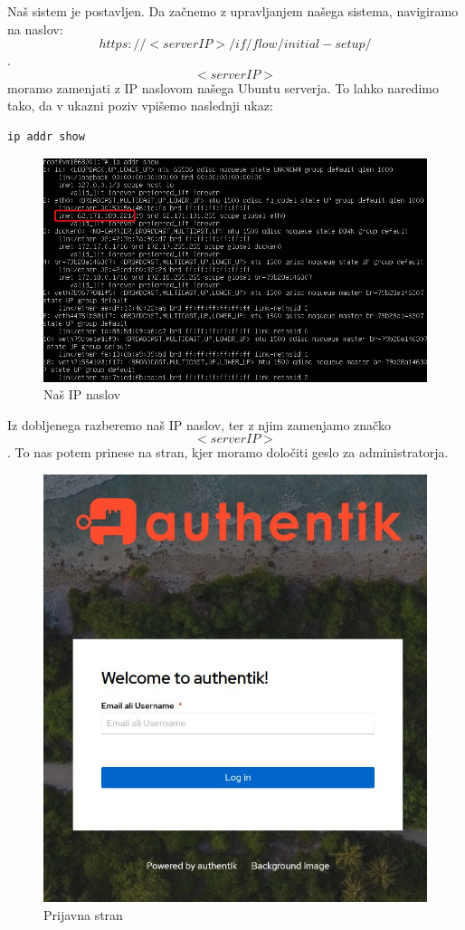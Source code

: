 \documentclass[a4paper,12pt,openright]{book}
\begin{document}
Naš sistem je postavljen. Da začnemo z upravljanjem našega sistema, navigiramo na naslov: $$https://<serverIP>/if/flow/initial-setup/$$. $$<serverIP>$$ moramo zamenjati z IP naslovom našega Ubuntu serverja. To lahko naredimo tako, da v ukazni poziv vpišemo naslednji ukaz:
\begin{lstlisting}[language=bash]
ip addr show
\end{lstlisting}

\begin{figure}[H]
\includegraphics[scale=0.75]{diploma-FRI-vzorec_11maj2021/IP naslov.jpg}
\caption{Naš IP naslov}
\label{fig:student}
\end{figure}

Iz dobljenega razberemo naš IP naslov, ter z njim zamenjamo značko $$<serverIP>$$. To nas potem prinese na stran, kjer moramo določiti geslo za administratorja. 

\begin{figure}[H]
\includegraphics[scale=0.75]{diploma-FRI-vzorec_11maj2021/Uvodna stran.jpg}
\caption{Prijavna stran}
\label{fig}
\end{figure}
\end{document}
